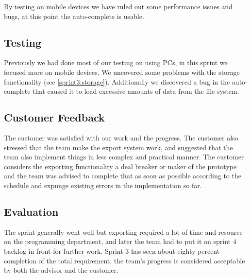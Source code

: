 \label{Auto-complete}

By testing on mobile devices we have ruled out some performance issues and bugs,
at this point the auto-complete is usable.

\subsection{Testing}

Previously we had done most of our testing on using PCs, in this sprint we
focused more on mobile devices. We uncovered some problems with the
storage functionality (see \ref{sprint3:storage}). Additionally we discovered
a bug in the auto-complete that caused it to load excessive amounts of data from
the file system.

\subsection{Customer Feedback}

The customer was satisfied with our work and the progress. The customer
also stressed that the team make the export system work, and suggested that
the team also implement things in less complex and practical manner. The
customer considers the exporting functionality a deal breaker or maker of
the prototype and the team was advised to complete that as soon as possible
according to the schedule and expunge existing errors in the implementation
so far.

\subsection{Evaluation}

The sprint generally went well but exporting required a lot of time and
resource on the programming department, and later the team had to put it on
sprint 4 backlog in front for further work. Sprint 3 has seen about eighty
percent completion of the total requirement, the team's progress is considered
acceptable by both the advisor and the customer. 

